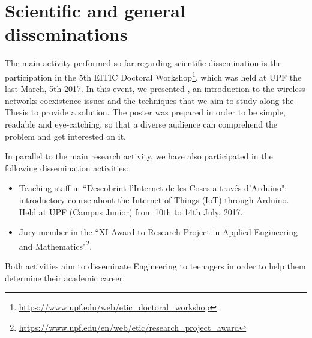 \documentclass[12pt, a4paper,twoside]{article}
\begin{document}
	\section{Scientific and general disseminations}
	\label{section:dissemination}			
	The main activity performed so far regarding scientific dissemination is the participation in the 5th EITIC Doctoral Workshop\footnote{\url{https://www.upf.edu/web/etic_doctoral_workshop}}, which was held at UPF the last March, 5th 2017. In this event, we presented \cite{wilhelmi2017improving}, an introduction to the wireless networks coexistence issues and the techniques that we aim to study along the Thesis to provide a solution. The poster was prepared in order to be simple, readable and eye-catching, so that a diverse audience can comprehend the problem and get interested on it.
	
	In parallel to the main research activity, we have also participated in the following dissemination activities:
	\begin{itemize}
		\item Teaching staff in ``Descobrint l'Internet de les Coses a través d'Arduino": introductory course about the Internet of Things (IoT) through Arduino. Held at UPF (Campus Junior) from 10th to 14th July, 2017.
		\item Jury member in the ``XI Award to Research Project in Applied Engineering and Mathematics"\footnote{\url{https://www.upf.edu/en/web/etic/research_project_award}}.
	\end{itemize}
	Both activities aim to disseminate Engineering to teenagers in order to help them determine their academic career.
	
\end{document}
